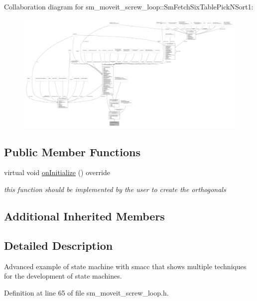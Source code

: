 Collaboration diagram for sm\+\_\+moveit\+\_\+screw\+\_\+loop\+:\+:Sm\+Fetch\+Six\+Table\+Pick\+N\+Sort1\+:
\nopagebreak
\begin{figure}[H]
\begin{center}
\leavevmode
\includegraphics[width=350pt]{structsm__moveit__screw__loop_1_1SmFetchSixTablePickNSort1__coll__graph}
\end{center}
\end{figure}
\subsection*{Public Member Functions}
\begin{DoxyCompactItemize}
\item 
virtual void \hyperlink{structsm__moveit__screw__loop_1_1SmFetchSixTablePickNSort1_a1d6d736d4261244a85c293b53ccce2c4}{on\+Initialize} () override
\begin{DoxyCompactList}\small\item\em this function should be implemented by the user to create the orthogonals \end{DoxyCompactList}\end{DoxyCompactItemize}
\subsection*{Additional Inherited Members}


\subsection{Detailed Description}
Advanced example of state machine with smacc that shows multiple techniques for the development of state machines. 

Definition at line 65 of file sm\+\_\+moveit\+\_\+screw\+\_\+loop.\+h.




